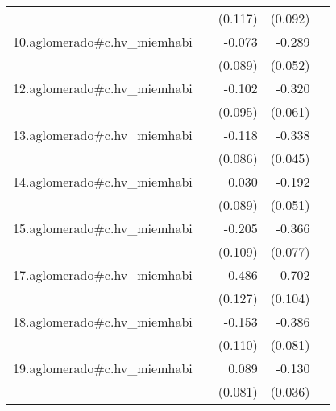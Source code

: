 {\begin{longtable}{l*{4}{D{.}{.}{-1}}}
            &                     &     (0.117)         &     (0.092)         &                     \\
\addlinespace
10.aglomerado#c.hv\_miemhabi&                     &      -0.073         &      -0.289\sym{***}&                     \\
            &                     &     (0.089)         &     (0.052)         &                     \\
\addlinespace
12.aglomerado#c.hv\_miemhabi&                     &      -0.102         &      -0.320\sym{***}&                     \\
            &                     &     (0.095)         &     (0.061)         &                     \\
\addlinespace
13.aglomerado#c.hv\_miemhabi&                     &      -0.118         &      -0.338\sym{***}&                     \\
            &                     &     (0.086)         &     (0.045)         &                     \\
\addlinespace
14.aglomerado#c.hv\_miemhabi&                     &       0.030         &      -0.192\sym{***}&                     \\
            &                     &     (0.089)         &     (0.051)         &                     \\
\addlinespace
15.aglomerado#c.hv\_miemhabi&                     &      -0.205         &      -0.366\sym{***}&                     \\
            &                     &     (0.109)         &     (0.077)         &                     \\
\addlinespace
17.aglomerado#c.hv\_miemhabi&                     &      -0.486\sym{***}&      -0.702\sym{***}&                     \\
            &                     &     (0.127)         &     (0.104)         &                     \\
\addlinespace
18.aglomerado#c.hv\_miemhabi&                     &      -0.153         &      -0.386\sym{***}&                     \\
            &                     &     (0.110)         &     (0.081)         &                     \\
\addlinespace
19.aglomerado#c.hv\_miemhabi&                     &       0.089         &      -0.130\sym{***}&                     \\
            &                     &     (0.081)         &     (0.036)         &                     \\

\end{longtable}}
